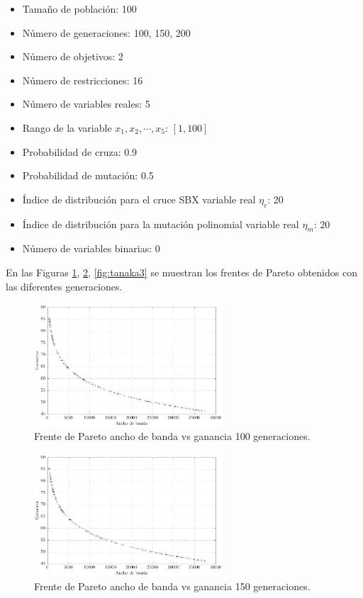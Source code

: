 \documentclass[conference]{IEEEtran}
\begin{document}
\begin{itemize}
\item Tamaño de población: 100
\item Número de generaciones: 100, 150, 200
\item Número de objetivos: 2
\item Número de restricciones: 16
\item Número de variables reales: 5
\item Rango de la variable $x_{1},x_{2}, \cdots ,x_{5}$: $[ 1,100]$
\item Probabilidad de cruza: 0.9
\item Probabilidad de mutación: 0.5
\item Índice de distribución para el cruce SBX variable real $\eta_{c}$:   20 
\item Índice de distribución para la mutación polinomial variable real $\eta_{m}$: 20
\item Número de variables binarias: 0
\end{itemize}


En las Figuras \ref{fig:tanaka1}, \ref{fig:tanaka2}, \ref{fig:tanaka3} se muestran los frentes de Pareto obtenidos con las diferentes generaciones.

\begin{figure}[hbtp]
\centering
\includegraphics[width=7cm]{100.pdf}
\caption{Frente de Pareto ancho de banda vs ganancia 100 generaciones.}
\label{fig:tanaka1}
\end{figure}

\begin{figure}[hbtp]
\centering
\includegraphics[width=7cm]{150.pdf}
\caption{Frente de Pareto ancho de banda vs ganancia 150 generaciones.}
\label{fig:tanaka2}
\end{figure}
\end{document}
